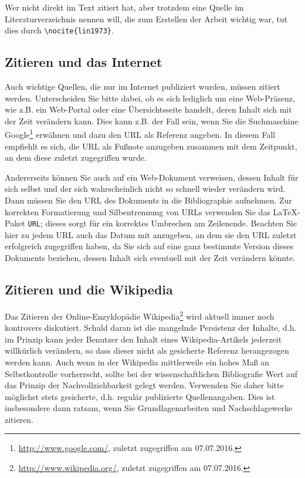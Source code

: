 Wer nicht direkt im Text zitiert hat, aber trotzdem eine Quelle im Literaturverzeichnis nennen will, die zum Erstellen der Arbeit wichtig war, tut dies durch \verb+\nocite{lin1973}+.

\nocite{lin1973}

\nocite{*} %

\subsection{Zitieren und das Internet}
Auch wichtige Quellen, die nur im Internet publiziert wurden, müssen zitiert werden.
Unterscheiden Sie bitte dabei, ob es sich lediglich um eine Web-Präsenz, wie z.B. ein Web-Portal oder eine Übersichtsseite handelt, deren Inhalt sich mit der Zeit verändern kann. 
Dies kann z.B. der Fall sein, wenn Sie die Suchmaschine Google\footnote{\url{http://www.google.com/}, zuletzt zugegriffen am 07.07.2016.} erwähnen und dazu den URL als Referenz angeben.
In diesem Fall empfiehlt es sich, die URL als Fußnote anzugeben zusammen mit dem Zeitpunkt, an dem diese zuletzt zugegriffen wurde.

\smallskip

Andererseits können Sie auch auf ein Web-Dokument verweisen, dessen Inhalt für sich selbst und der sich wahrscheinlich nicht so schnell wieder verändern wird.
Dann müssen Sie den URL des Dokuments in die Bibliographie aufnehmen.
Zur korrekten Formatierung und Silbentrennung von URLs verwenden Sie das \LaTeX-Paket {\tt URL}; dieses sorgt für ein korrektes Umbrechen am Zeilenende.
Beachten Sie hier zu jedem URL auch das Datum mit anzugeben, an dem sie den URL zuletzt erfolgreich zugegriffen haben, da Sie sich auf eine ganz bestimmte Version dieses Dokuments beziehen, dessen Inhalt sich eventuell mit der Zeit verändern könnte.


\subsection{Zitieren und die Wikipedia}
Das Zitieren der Online-Enzyklopädie Wikipedia\footnote{\url{http://www.wikipedia.org/}, zuletzt zugegriffen am 07.07.2016.} wird aktuell immer noch kontrovers diskutiert.
Schuld daran ist die mangelnde Persistenz der Inhalte, d.h. im Prinzip kann jeder Benutzer den Inhalt eines Wikipedia-Artikels jederzeit willkürlich verändern, so dass dieser nicht als gesicherte Referenz herangezogen werden kann.
Auch wenn in der Wikipedia mittlerweile ein hohes Maß an Selbstkontrolle vorherrscht, sollte bei der wissenschaftlichen Bibliografie Wert auf das Prinzip der Nachvollziehbarkeit gelegt werden.
Verwenden Sie daher bitte möglichst stets gesicherte, d.h. regulär publizierte Quellenangaben.
Dies ist insbesondere dann ratsam, wenn Sie Grundlagenarbeiten und Nachschlagewerke zitieren.

